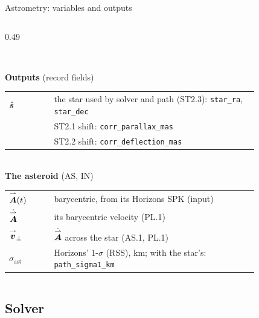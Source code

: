 \begin{frame}{Astrometry: variables and outputs}
\begin{columns}[T]
\begin{column}{0.49\textwidth}
\begin{tabular}{@{}l >{\raggedright\arraybackslash}p{0.82\linewidth}@{}}
      \end{tabular}\\[0.6ex]
      \textbf{Outputs} {\tiny(record fields)}\\[0.3ex]
      \begin{tabular}{@{}l >{\raggedright\arraybackslash}p{0.82\linewidth}@{}}
        $\hat{\bm{s}}$ & the star used by solver and path (ST2.3): \texttt{star\_ra}, \texttt{star\_dec} \\
        & ST2.1 shift: \texttt{corr\_parallax\_mas} \\
        & ST2.2 shift: \texttt{corr\_deflection\_mas} \\
      \end{tabular}\\[0.6ex]
      \textbf{The asteroid} (AS, IN)\\[0.3ex]
      \begin{tabular}{@{}l >{\raggedright\arraybackslash}p{0.82\linewidth}@{}}
        $\overset{\rightharpoonup}{\bm{A}}(t)$ & barycentric, from its Horizons SPK (input) \\
        $\dot{\overset{\rightharpoonup}{\bm{A}}}$ & its barycentric velocity (PL.1) \\
        $\overset{\rightharpoonup}{\bm{v}}_\perp$ & $\dot{\overset{\rightharpoonup}{\bm{A}}}$ across the star (AS.1, PL.1) \\
        $\sigma_{\mathrm{ast}}$ & Horizons' 1-$\sigma$ (RSS), km; with the star's: \texttt{path\_sigma1\_km} \\
      \end{tabular}
    \end{column}
  \end{columns}
\end{frame}

\subsection{Solver}

